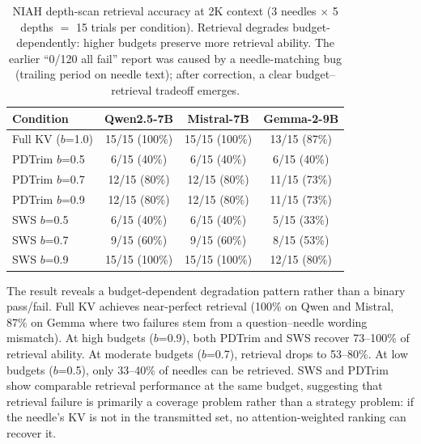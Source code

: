 \documentclass[11pt]{article}
\newcommand{\sws}{SWS}
\newcommand{\pct}{\%}
\theoremstyle{definition}
\theoremstyle{plain}
\begin{document}
\begin{table}[t]
\centering
\caption{NIAH depth-scan retrieval accuracy at 2K context (3 needles $\times$ 5 depths $=$ 15 trials per condition).  Retrieval degrades budget-dependently: higher budgets preserve more retrieval ability.  The earlier ``0/120 all fail'' report was caused by a needle-matching bug (trailing period on needle text); after correction, a clear budget--retrieval tradeoff emerges.}
\label{tab:niah}
\small
\begin{tabular}{lccc}
\toprule
Condition & Qwen2.5-7B & Mistral-7B & Gemma-2-9B \\
\midrule
Full KV ($b$=1.0) & 15/15 (100\pct{}) & 15/15 (100\pct{}) & 13/15 (87\pct{}) \\
PDTrim $b$=0.5 & 6/15 (40\pct{}) & 6/15 (40\pct{}) & 6/15 (40\pct{}) \\
PDTrim $b$=0.7 & 12/15 (80\pct{}) & 12/15 (80\pct{}) & 11/15 (73\pct{}) \\
PDTrim $b$=0.9 & 12/15 (80\pct{}) & 12/15 (80\pct{}) & 11/15 (73\pct{}) \\
\sws{} $b$=0.5 & 6/15 (40\pct{}) & 6/15 (40\pct{}) & 5/15 (33\pct{}) \\
\sws{} $b$=0.7 & 9/15 (60\pct{}) & 9/15 (60\pct{}) & 8/15 (53\pct{}) \\
\sws{} $b$=0.9 & 15/15 (100\pct{}) & 15/15 (100\pct{}) & 12/15 (80\pct{}) \\
\bottomrule
\end{tabular}
\end{table}

The result reveals a budget-dependent degradation pattern rather than a binary pass/fail.  Full KV achieves near-perfect retrieval (100\pct{} on Qwen and Mistral, 87\pct{} on Gemma where two failures stem from a question--needle wording mismatch).  At high budgets ($b$=0.9), both PDTrim and \sws{} recover 73--100\pct{} of retrieval ability.  At moderate budgets ($b$=0.7), retrieval drops to 53--80\pct{}.  At low budgets ($b$=0.5), only 33--40\pct{} of needles can be retrieved.  SWS and PDTrim show comparable retrieval performance at the same budget, suggesting that retrieval failure is primarily a coverage problem rather than a strategy problem: if the needle's KV is not in the transmitted set, no attention-weighted ranking can recover it.
\end{document}
